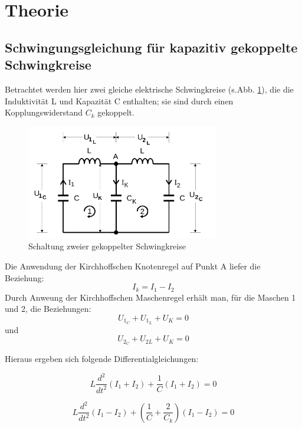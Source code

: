 \section{Theorie}
\label{sec:Theorie}


\subsection{Schwingungsgleichung für kapazitiv gekoppelte Schwingkreise}
Betrachtet werden hier zwei gleiche elektrische Schwingkreise (s.Abb. \ref{fig:Abb2}), die die Induktivität L und Kapazität C enthalten;
sie sind durch einen Kopplungswiderstand $ C_k$ gekoppelt.
\begin{figure}
  \centering
  \includegraphics[height=5cm]{./logos/Abb2.png}
  \caption{Schaltung zweier gekoppelter Schwingkreise\cite{sample}}
  \label{fig:Abb2}
\end{figure}
\FloatBarrier
Die Anwendung der Kirchhoffschen Knotenregel auf Punkt A liefer die Beziehung:
\begin{equation}
 I_k = I_1 - I_2
 \label{eqn:KK}
\end{equation}
Durch Anweung der Kirchhoffschen Maschenregel erhält man, für die Maschen 1 und 2, die Beziehungen:
\begin{equation}
  U_{1_{C}} + U_{1_{L}} + U_K = 0
  \label{eqn:KM1}
\end{equation}
 und
 \begin{equation}
   U_{2_{C}} + U_{2{L}} + U_K = 0
   \label{eqn:KM2}
 \end{equation}

Hieraus ergeben sich folgende Differentialgleichungen:

\begin{equation}
  L \frac{d^2}{dt^2}(I_1 + I_2) + \frac{1}{C} (I_1 + I_2) = 0
  \label{eqn:Diff1p}
\end{equation}

\begin{equation}
  L \frac{d^2}{dt^2}(I_1 - I_2) + \left(\frac{1}{C} + \frac{2}{C_k}\right) (I_1 - I_2) = 0
  \label{eqn:Diff2m}
\end{equation}

